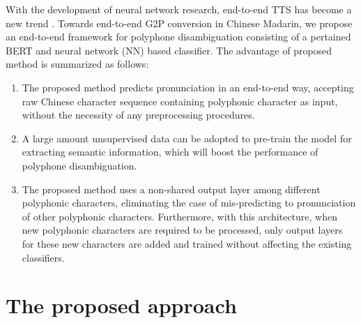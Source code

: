 \documentclass[a4paper]{article}
\begin{document}
With the development of neural network research, end-to-end TTS has become a new trend \cite{sotelo2017char2wav, wang2017tacotron, li2018close}. Towards end-to-end G2P conversion in Chinese Madarin, we propose an end-to-end framework for polyphone disambiguation consisting of a pertained BERT \cite{devlin2018bert} and neural network (NN) based classifier. The advantage of proposed method is summarized as follows:
\begin{enumerate}
	\item The proposed method predicts pronunciation in an end-to-end way, accepting raw Chinese character sequence containing polyphonic character as input, without the necessity of any preprocessing procedures.
	\item A large amount unsupervised data can be adopted to pre-train the model for extracting semantic information, which will boost the performance of polyphone disambiguation.
	\item The proposed method uses a non-shared output layer among different polyphonic characters, eliminating the case of mis-predicting to pronunciation of other polyphonic characters. Furthermore, with this architecture, when new polyphonic characters are required to be processed, only output layers for these new characters are added and trained without affecting the existing classifiers.
\end{enumerate}


\section{The proposed approach}
\end{document}
